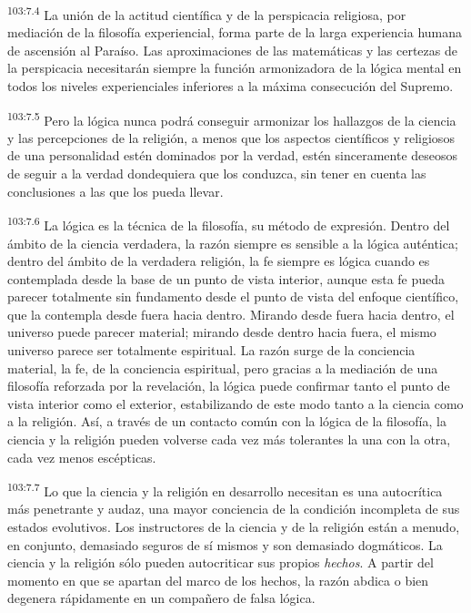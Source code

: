 \par
\textsuperscript{103:7.4} La unión de la actitud científica y de la perspicacia religiosa, por mediación de la filosofía experiencial, forma parte de la larga experiencia humana de ascensión al Paraíso. Las aproximaciones de las matemáticas y las certezas de la perspicacia necesitarán siempre la función armonizadora de la lógica mental en todos los niveles experienciales inferiores a la máxima consecución del Supremo.

\par
\textsuperscript{103:7.5} Pero la lógica nunca podrá conseguir armonizar los hallazgos de la ciencia y las percepciones de la religión, a menos que los aspectos científicos y religiosos de una personalidad estén dominados por la verdad, estén sinceramente deseosos de seguir a la verdad dondequiera que los conduzca, sin tener en cuenta las conclusiones a las que los pueda llevar.

\par
\textsuperscript{103:7.6} La lógica es la técnica de la filosofía, su método de expresión. Dentro del ámbito de la ciencia verdadera, la razón siempre es sensible a la lógica auténtica; dentro del ámbito de la verdadera religión, la fe siempre es lógica cuando es contemplada desde la base de un punto de vista interior, aunque esta fe pueda parecer totalmente sin fundamento desde el punto de vista del enfoque científico, que la contempla desde fuera hacia dentro. Mirando desde fuera hacia dentro, el universo puede parecer material; mirando desde dentro hacia fuera, el mismo universo parece ser totalmente espiritual. La razón surge de la conciencia material, la fe, de la conciencia espiritual, pero gracias a la mediación de una filosofía reforzada por la revelación, la lógica puede confirmar tanto el punto de vista interior como el exterior, estabilizando de este modo tanto a la ciencia como a la religión. Así, a través de un contacto común con la lógica de la filosofía, la ciencia y la religión pueden volverse cada vez más tolerantes la una con la otra, cada vez menos escépticas.

\par
\textsuperscript{103:7.7} Lo que la ciencia y la religión en desarrollo necesitan es una autocrítica más penetrante y audaz, una mayor conciencia de la condición incompleta de sus estados evolutivos. Los instructores de la ciencia y de la religión están a menudo, en conjunto, demasiado seguros de sí mismos y son demasiado dogmáticos. La ciencia y la religión sólo pueden autocriticar sus propios \textit{hechos}. A partir del momento en que se apartan del marco de los hechos, la razón abdica o bien degenera rápidamente en un compañero de falsa lógica.

